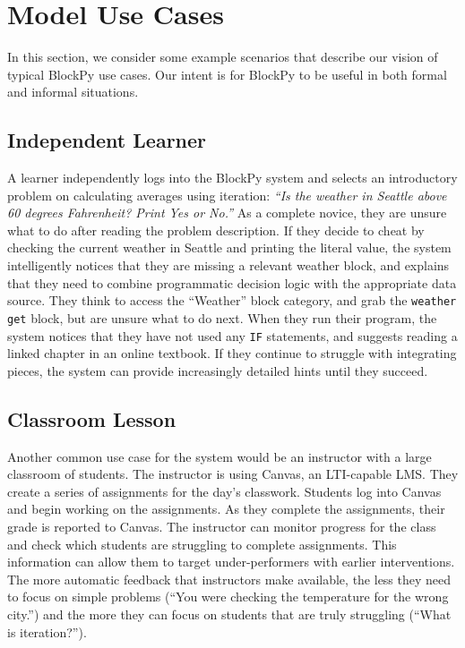 \documentclass[10pt, conference, compsocconf]{IEEEtran}
\begin{document}
\section{Model Use Cases}

In this section, we consider some example scenarios that describe our vision of typical BlockPy use cases.
Our intent is for BlockPy to be useful in both formal and informal situations.

\subsection{Independent Learner}

A learner independently logs into the BlockPy system and selects an introductory problem on calculating averages using iteration: \textit{``Is the weather in Seattle above 60 degrees Fahrenheit? Print Yes or No.''} 
As a complete novice, they are unsure what to do after reading the problem description.
If they decide to cheat by checking the current weather in Seattle and printing the literal value, the system intelligently notices that they are missing a relevant weather block, and explains that they need to combine programmatic decision logic with the appropriate data source.
They think to access the ``Weather'' block category, and grab the \texttt{weather get} block, but are unsure what to do next.
When they run their program, the system notices that they have not used any \texttt{IF} statements, and suggests reading a linked chapter in an online textbook.
If they continue to struggle with integrating pieces, the system can provide increasingly detailed hints until they succeed.

\subsection{Classroom Lesson}

Another common use case for the system would be an instructor with a large classroom of students.
The instructor is using Canvas, an LTI-capable LMS.
They create a series of assignments for the day's classwork.
Students log into Canvas and begin working on the assignments.
As they complete the assignments, their grade is reported to Canvas.
The instructor can monitor progress for the class and check which students are struggling to complete assignments.
This information can allow them to target under-performers with earlier interventions.
The more automatic feedback that instructors make available, the less they need to focus on simple problems (``You were checking the temperature for the wrong city.'') and the more they can focus on students that are truly struggling (``What is iteration?'').
\end{document}
